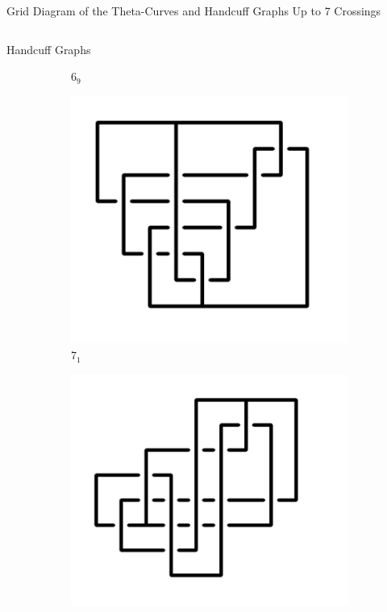 \documentclass[final]{beamer}
\begin{document}
\begin{frame}[t]
\begin{alertblock}{Grid Diagram of the Theta-Curves and Handcuff Graphs Up to 7 Crossings}
\begin{columns}[t]
\begin{column}{0.5\textwidth}
\begin{alertblock}{Handcuff Graphs}
\begin{figure}
\begin{subfigure}{0.075\textwidth}
    \caption{$6_{9}$} 
    \end{subfigure}
    \begin{subfigure}{0.075\textwidth}
    \includegraphics[width=\columnwidth]{../Midterm_Poster/grid_diagram/handcuff_7_1.png}
    \caption{$7_{1}$} 
    \end{subfigure}
    \begin{subfigure}{0.075\textwidth}
    \includegraphics[width=\columnwidth]{../Midterm_Poster/grid_diagram/handcuff_7_2.png}

\end{subfigure}
\end{figure}
\end{alertblock}
\end{column}
\end{columns}
\end{alertblock}
\end{frame}
\end{document}
